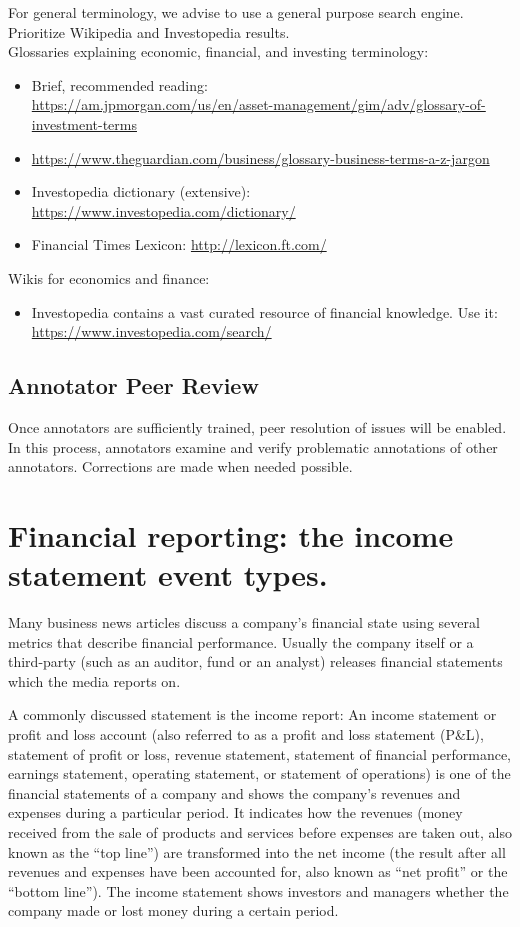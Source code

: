 For general terminology, we advise to use a general purpose search engine.
Prioritize Wikipedia and Investopedia results.\\

\noindent
Glossaries explaining economic, financial, and investing terminology:
\begin{itemize}[noitemsep, leftmargin=*]
    \item Brief, recommended reading:\\ \url{https://am.jpmorgan.com/us/en/asset-management/gim/adv/glossary-of-investment-terms}
    \item \url{https://www.theguardian.com/business/glossary-business-terms-a-z-jargon}
    \item Investopedia dictionary (extensive): \url{https://www.investopedia.com/dictionary/}
    \item Financial Times Lexicon: \url{http://lexicon.ft.com/}
\end{itemize}

\noindent
Wikis for economics and finance:
\begin{itemize}[noitemsep, leftmargin=*]
    \item Investopedia contains a vast curated resource of financial knowledge. Use it:\\
    \url{https://www.investopedia.com/search/}
\end{itemize}

\subsection{Annotator Peer Review}
Once annotators are sufficiently trained, peer resolution of issues will be enabled.
In this process, annotators examine and verify problematic annotations of other annotators.
Corrections are made when needed possible.

\section{Financial reporting: the income statement event types.}

Many business news articles discuss a company's financial state using several metrics that describe financial performance.
Usually the company itself or a third-party (such as an auditor, fund or an analyst) releases financial statements which the media reports on.

A commonly discussed statement is the income report: An income statement or profit and loss account (also referred to as a profit and loss statement (P\&L), statement of profit or loss, revenue statement, statement of financial performance, earnings statement, operating statement, or statement of operations) is one of the financial statements of a company and shows the company’s revenues and expenses during a particular period.
It indicates how the revenues (money received from the sale of products and services before expenses are taken out, also known as the “top line”) are transformed into the net income (the result after all revenues and expenses have been accounted for, also known as “net profit” or the “bottom line”).
The income statement shows investors and managers whether the company made or lost money during a certain period. 


